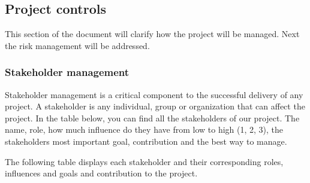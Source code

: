 \subsection{Project controls}

This section of the document will clarify how the project will be managed.
Next the risk management will be addressed.

\subsubsection{Stakeholder management}

Stakeholder management is a critical component to the successful delivery of any project.
A stakeholder is any individual, group or organization that can affect the project.
In the table below, you can find all the stakeholders of our project.
The name, role, how much influence do they have from low to high (1, 2, 3), the stakeholders most important goal,
contribution and the best way to manage.

The following table displays each stakeholder and their corresponding roles, influences and goals and contribution to
the project.

